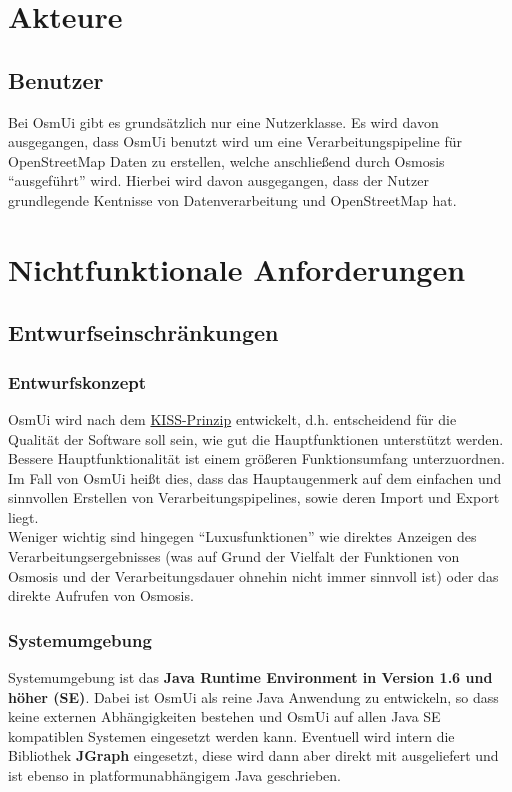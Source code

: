 \documentclass[a4paper,10pt]{scrartcl}
\begin{document}
\section{Akteure}
\subsection{Benutzer}
Bei OsmUi gibt es grundsätzlich nur eine Nutzerklasse. Es wird davon ausgegangen, dass OsmUi benutzt wird um eine Verarbeitungspipeline für OpenStreetMap Daten
zu erstellen, welche anschließend durch Osmosis ``ausgeführt'' wird. Hierbei wird davon ausgegangen, dass der Nutzer grundlegende Kentnisse 
von Datenverarbeitung und OpenStreetMap hat.

\section{Nichtfunktionale Anforderungen}
\subsection{Entwurfseinschränkungen}
\subsubsection{Entwurfskonzept}
OsmUi wird nach dem \href{http://de.wikipedia.org/wiki/KISS-Prinzip}{KISS-Prinzip} entwickelt, d.h. entscheidend für die Qualität der Software soll
sein, wie gut die Hauptfunktionen unterstützt werden. Bessere Hauptfunktionalität ist einem größeren Funktionsumfang unterzuordnen.\\
Im Fall von OsmUi heißt dies, dass das Hauptaugenmerk auf dem einfachen und sinnvollen Erstellen von Verarbeitungspipelines, sowie deren Import und Export liegt.\\
Weniger wichtig sind hingegen ``Luxusfunktionen'' wie direktes Anzeigen des Verarbeitungsergebnisses (was auf Grund der Vielfalt der Funktionen von Osmosis
und der Verarbeitungsdauer ohnehin nicht immer sinnvoll ist) oder das direkte Aufrufen von Osmosis.
\subsubsection{Systemumgebung}
Systemumgebung ist das \textbf{Java Runtime Environment in Version 1.6 und höher (SE)}. Dabei ist OsmUi als reine Java Anwendung zu entwickeln, so dass
keine externen Abhängigkeiten bestehen und OsmUi auf allen Java SE kompatiblen Systemen eingesetzt werden kann.
Eventuell wird intern die Bibliothek \textbf{JGraph} eingesetzt, diese wird dann aber direkt mit ausgeliefert
und ist ebenso in platformunabhängigem Java geschrieben. 
\end{document}
